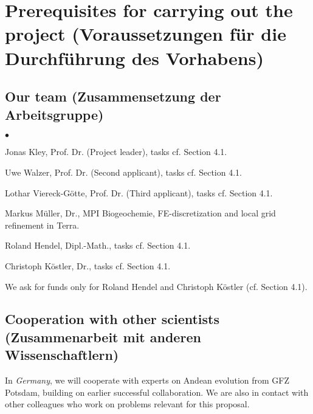 \documentclass[twoside,10pt]{article}
\newenvironment{dlist}
   {\begin{list}
      {$\bullet$}
      {
      \setlength{\topsep}{0.5ex}
      \setlength{\partopsep}{0.0ex}
      \setlength{\parsep}{0.5ex}
      \setlength{\itemsep}{0.0ex}
      \setlength{\itemindent}{3.0ex}
      \setlength{\leftmargin}{0.0ex}
      \setlength{\labelsep}{1.0ex}
      }
   }
   {\end{list}}
\begin{document}
%
%

\section{Prerequisites for carrying out the project 
   (Voraussetzungen f\"ur die Durchf\"uhrung des Vorhabens) }

\subsection{Our team (Zusammensetzung der Arbeitsgruppe)}
\begin{dlist}
   \item Jonas Kley, Prof. Dr. (Project leader), tasks cf. Section 4.1.
   \item Uwe Walzer, Prof. Dr. (Second applicant), tasks cf. Section 4.1.
   \item Lothar Viereck-G\"otte, Prof. Dr. (Third applicant), tasks cf. Section 4.1.
   \item Markus M\"uller, Dr., MPI Biogeochemie, FE-discretization and local grid refinement in Terra.
   \item Roland Hendel, Dipl.-Math., tasks cf. Section 4.1.
   \item Christoph K\"ostler, Dr., tasks cf. Section 4.1.
\end{dlist}
We ask for funds only for Roland Hendel and Christoph K\"ostler (cf. Section 4.1).

\subsection{Cooperation with other scientists (Zusammenarbeit mit anderen Wissenschaftlern)}
\label{sec:coop}
In \emph{Germany}, we will cooperate with experts on Andean evolution from GFZ Potsdam, building on earlier successful collaboration. 
We are also in contact with other colleagues who work on problems relevant for this proposal.
\end{document}
